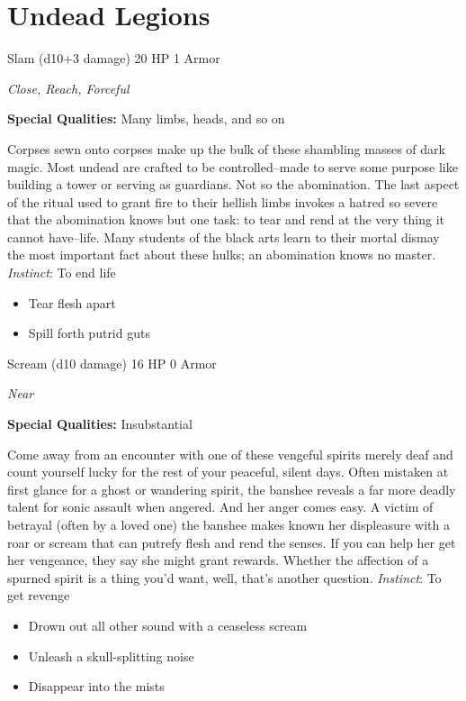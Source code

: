 \section{Undead Legions}

\HRule
{}

Slam (d10+3 damage)\hspace*{\fill} 20 HP 1 Armor

\emph{Close, Reach, Forceful}

\textbf{Special Qualities:}
Many limbs, heads, and so on

\HRule
Corpses sewn onto corpses make up the bulk of these shambling masses of dark magic. Most undead are crafted to be controlled--made to serve some purpose like building a tower or serving as guardians. Not so the abomination. The last aspect of the ritual used to grant fire to their hellish limbs invokes a hatred so severe that the abomination knows but one task: to tear and rend at the very thing it cannot have--life. Many students of the black arts learn to their mortal dismay the most important fact about these hulks; an abomination knows no master. \emph{Instinct}: To end life
\begin{itemize}
\item Tear flesh apart
\item Spill forth putrid guts
\end{itemize}
\newpage
\HRule
{}

Scream (d10 damage)\hspace*{\fill} 16 HP 0 Armor

\emph{Near}

\textbf{Special Qualities:}
Insubstantial

\HRule
Come away from an encounter with one of these vengeful spirits merely deaf and count yourself lucky for the rest of your peaceful, silent days. Often mistaken at first glance for a ghost or wandering spirit, the banshee reveals a far more deadly talent for sonic assault when angered. And her anger comes easy. A victim of betrayal (often by a loved one) the banshee makes known her displeasure with a roar or scream that can putrefy flesh and rend the senses. If you can help her get her vengeance, they say she might grant rewards. Whether the affection of a spurned spirit is a thing you'd want, well, that's another question. \emph{Instinct}: To get revenge
\begin{itemize}
\item Drown out all other sound with a ceaseless scream
\item Unleash a skull-splitting noise
\item Disappear into the mists
\end{itemize}
\newpage
\HRule
{}

